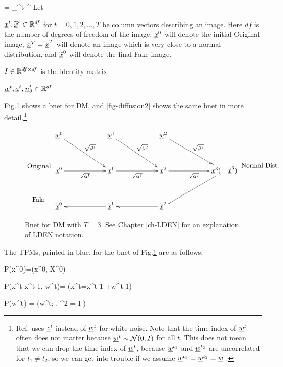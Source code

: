 \beq
\prodalp= \prod_{}^t \alp^\tau
\eeq
Let 

$\rvx^t, \TIL{\rvx}^t\in \RR^{df}$ for $t=0, 1, 2,
\ldots, T$ be column vectors
describing an image. Here $df$
is the number of degrees of freedom 
of the image. $\rvx^0$ 
will denote the initial Original image,
$\rvx^T=\TIL{\rvx}^T$
will denote an image which 
is very close to a 
normal distribution,
and $\TIL{\rvx}^0$
will denote the final Fake image.

$I\in { \mathbb{R}}^{df\times df}$ is the 
identity matrix

$\rvw^t, \rva^t,
\rvn^t_\theta \in\RR^{df}$



Fig.\ref{fig-diffusion1} shows a
bnet for DM, and  
\ref{fig-diffusion2}
shows the same bnet 
in more detail.\footnote{
Ref.\cite{weng-diffusion-model} uses $\rvz^{t}$ 
instead of $\rvw^{t}$
for white noise.
Note that 
the time index
of 
$\rvw^{t}$
often does not matter
because 
$\rvw^{t}\sim \caln(0, I)$
for all $t$.
This does not mean
that we can drop the
time index of $\rvw^t$,
because $\rvw^{t_1}$
and $\rvw^{t_2}$
are uncorrelated for $t_1\neq t_2$,
so we can get into 
trouble if we assume
$\rvw^{t_1}=\rvw^{t_2}=\rvw$ .
}

\begin{figure}[h!]
$$
\xymatrix@C=5pc@R=3pc{
\\
\text{Original}
\\
\text{Fake}
}
\xymatrix@C=5pc@R=3pc{
\rvw^0\ar[dr]^{\sqrt{\beta^1}}
&\rvw^1\ar[dr]^{\sqrt{\beta^2}}
&\rvw^2\ar[dr]^{\sqrt{\beta^3}}
\\
\rvx^0\ar[r]_{\sqrt{\alp^1}}
&\rvx^1\ar[r]_{\sqrt{\alp^2}}
&\rvx^2\ar[r]_{\sqrt{\alp^3}}
&\rvx^3(= \TIL{\rvx}^3)\ar[dl]
\\
\TIL{\rvx}^0
&\TIL{\rvx}^1\ar[l]
&\TIL{\rvx}^2\ar[l]
&
}
\xymatrix@C=5pc@R=3pc{
\\
\text{Normal Dist.}
}
$$
\caption{Bnet for DM with $T=3$.
See Chapter \ref{ch-LDEN}
 for an explanation of LDEN notation.}
\label{fig-diffusion1}
\end{figure}


The TPMs, printed in blue,
for the bnet of Fig.\ref{fig-diffusion1}
are as follows:

\beq \color{blue}
P(x^0)=\delta(x^0, X^0)
\quad {}
\eeq

\beq \color{blue}
P(x^t|x^{t-1}, w^{t})=
\indi(\quad x^t=\;x^{t-1}
+\;w^{t-1}\quad)
\eeq

\beq \color{blue}
P(w^t) = \caln(w^t; ,
 \s^2 =  I ) \quad {}
\eeq


